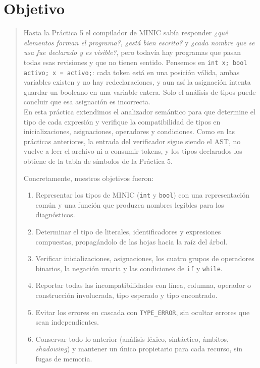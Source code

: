 \documentclass[12pt,letterpaper]{article}
\newcommand{\minic}{
  {M\footnotesize INI\normalsize C}
}
\begin{document}
\thispagestyle{empty}


\newpage

\section*{Objetivo}

\begin{quote}
  Hasta la Práctica 5 el compilador de \minic{} sabía responder \emph{¿qué elementos forman el programa?},
  \emph{¿está bien escrito?} y \emph{¿cada nombre que se usa fue declarado y es visible?}, pero todavía hay
  programas que pasan todas esas revisiones y que no tienen sentido. Pensemos en
  \texttt{int x; bool activo; x = activo;}: cada token está en una posición válida, ambas variables existen
  y no hay redeclaraciones, y aun así la asignación intenta guardar un booleano en una variable entera.
  Solo el análisis de tipos puede concluir que esa asignación es incorrecta.\\

  En esta práctica extendimos el analizador semántico para que determine el tipo de cada expresión y verifique
  la compatibilidad de tipos en inicializaciones, asignaciones, operadores y condiciones. Como en las prácticas
  anteriores, la entrada del verificador sigue siendo el AST, no vuelve a leer el archivo ni a consumir tokens,
  y los tipos declarados los obtiene de la tabla de símbolos de la Práctica 5.
  
  Concretamente, nuestros objetivos fueron:

  \begin{enumerate}[label=\arabic*.]
  \item Representar los tipos de \minic{} (\texttt{int} y \texttt{bool}) con una representación común y una
    función que produzca nombres legibles para los diagnósticos.
  \item Determinar el tipo de literales, identificadores y expresiones compuestas, propagándolo de las hojas
    hacia la raíz del árbol.
  \item Verificar inicializaciones, asignaciones, los cuatro grupos de operadores binarios, la negación unaria y
    las condiciones de \texttt{if} y \texttt{while}.
  \item Reportar todas las incompatibilidades con línea, columna, operador o construcción involucrada, tipo
    esperado y tipo encontrado.
  \item Evitar los errores en cascada con \texttt{TYPE\_ERROR}, sin ocultar errores que sean independientes.
  \item Conservar todo lo anterior (análisis léxico, sintáctico, ámbitos, \emph{shadowing}) y mantener un
    único propietario para cada recurso, sin fugas de memoria.
  \end{enumerate}
\end{quote}
\end{document}
